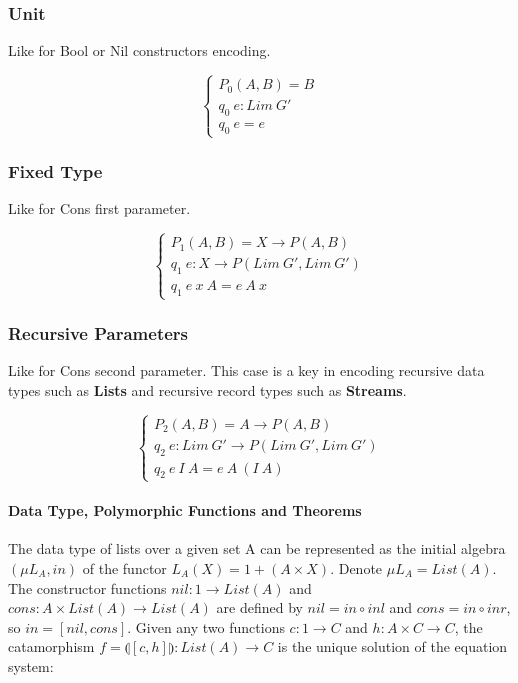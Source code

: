 \documentclass[11pt,oneside]{article}
\begin{document}
\subsubsection{Unit}

Like for Bool or Nil constructors encoding.

$$
\begin{cases}
P_0(A,B) =  B \\
q_0\ e : Lim\ G' \\
q_0\ e = e
\end{cases}
$$

\subsubsection{Fixed Type}

Like for Cons first parameter.

$$
\begin{cases}
P_1(A,B) = X \rightarrow P(A,B) \\
q_1\ e : X \rightarrow P ( Lim\ G',  Lim\ G' ) \\
q_1\ e\ x\ A = e\ A\ x
\end{cases}
$$

\subsubsection{Recursive Parameters}

Like for Cons second parameter. This case is a key in encoding recursive
   data types such as {\bf Lists} and recursive record types such as {\bf Streams}.

$$
\begin{cases}
P_2(A,B) = A \rightarrow P(A,B) \\
q_2\ e : Lim\ G' \rightarrow P ( Lim\ G',  Lim\ G' ) \\
q_2\ e\ I\ A = e\ A\ (I\ A)
\end{cases}
$$

\newpage
  \paragraph{Data Type, Polymorphic Functions and Theorems}
  The data type of lists over a given set A can be represented as the initial algebra
  $(\mu L_A, in)$ of the functor $L_A(X) = 1 + (A \times X)$. Denote $\mu L_A = List(A)$.
  The constructor functions $nil: 1 \rightarrow List(A)$ and
  $cons: A \times List(A) \rightarrow List(A)$ are defined by
  $nil = in \circ inl$ and $cons = in \circ inr$, so $in = [nil,cons]$.
  Given any two functions $c: 1 \rightarrow C$ and $h: A \times C \rightarrow C$,
  the catamorphism $f = \llparenthesis [c,h] \rrparenthesis : List(A) \rightarrow C$
  is the unique solution of the equation system:
\end{document}
